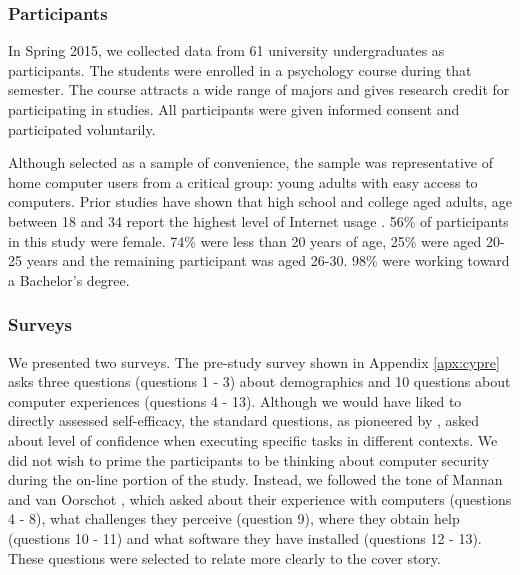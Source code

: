 \subsubsection*{Participants}
In Spring 2015, we collected data from 61 university undergraduates as participants. The students were enrolled in a psychology course during that semester. The course attracts a wide range of majors and gives research credit for participating in studies. All participants were given informed consent and participated voluntarily.

Although selected as a sample of convenience, the sample was representative of home computer users from a critical group: young adults with easy access to computers. Prior studies have shown that high school and college aged adults, age between 18 and 34 report the highest level of Internet usage \cite{census2012}. 56\% of participants in this study were female. 74\% were less than 20 years of age, 25\% were aged 20-25 years and the remaining participant was aged 26-30. 98\% were working toward a Bachelor's degree.

\subsubsection*{Surveys}
We presented two surveys. The pre-study survey shown in Appendix \ref{apx:cypre} asks three questions (questions 1 - 3) about demographics and 10 questions about computer experiences (questions 4 - 13). Although we would have liked to directly assessed self-efficacy, the standard questions, as pioneered by \cite{ng2007, claar2010}, asked about level of confidence when executing specific tasks in different contexts. We did not wish to prime the participants to be thinking about computer security during the on-line portion of the study. Instead, we followed the tone of Mannan and van Oorschot \cite{mannan2008}, which asked about their experience with computers (questions 4 - 8), what challenges they perceive (question 9), where they obtain help (questions 10 - 11) and what software they have installed (questions 12 - 13). These questions were selected to relate more clearly to the cover story.

